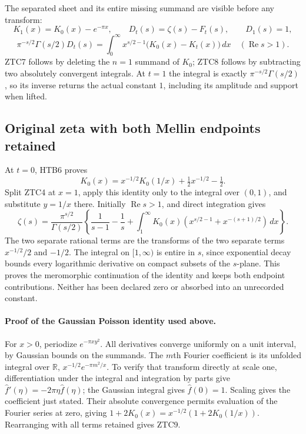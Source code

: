 \documentclass[11pt,a4paper]{article}
\theoremstyle{definition}\newtheorem{definition}[theorem]{Definition}
\begin{document}
The separated sheet and its entire missing summand are visible before
any transform:
\begin{equation}\tag{ZTC7}
 K_1(x)=K_0(x)-e^{-\pi x},\qquad
 D_t(s)=\zeta(s)-F_t(s),\qquad D_1(s)=1,
\end{equation}
\begin{equation}\tag{ZTC8}
 \pi^{-s/2}\Gamma(s/2)D_t(s)
   =\int_0^\infty x^{s/2-1}\bigl(K_0(x)-K_t(x)\bigr)\,dx
       \quad(\operatorname{Re}s>1).
\end{equation}
ZTC7 follows by deleting the $n=1$ summand of $K_0$; ZTC8 follows
by subtracting two absolutely convergent integrals. At $t=1$ the
integral is exactly $\pi^{-s/2}\Gamma(s/2)$, so its inverse returns
the actual constant $1$, including its amplitude and support when lifted.

\subsection{Original zeta with both Mellin endpoints retained}

At $t=0$, HTB6 proves
\begin{equation}\tag{ZTC9}
 K_0(x)=x^{-1/2}K_0(1/x)+\tfrac12x^{-1/2}-\tfrac12.
\end{equation}
Split ZTC4 at $x=1$, apply this identity only to the integral over
$(0,1)$, and substitute $y=1/x$ there. Initially
$\operatorname{Re}s>1$, and direct integration gives
\begin{equation}\tag{ZTC10}
 \zeta(s)=\frac{\pi^{s/2}}{\Gamma(s/2)}
 \left\{
 \frac1{s-1}-\frac1s
 +\int_1^\infty K_0(x)
             \left(x^{s/2-1}+x^{-(s+1)/2}\right)\,dx
 \right\}.
\end{equation}
The two separate rational terms are the transforms of the two separate
terms $x^{-1/2}/2$ and $-1/2$. The integral on $[1,\infty)$ is
entire in $s$, since exponential decay bounds every logarithmic
derivative on compact subsets of the $s$-plane. This proves the
meromorphic continuation of the identity and keeps both endpoint
contributions. Neither has been declared zero or absorbed into an
unrecorded constant.


\paragraph{Proof of the Gaussian Poisson identity used above.}
For $x>0$, periodize $e^{-\pi x y^2}$. All derivatives converge
uniformly on a unit interval, by Gaussian bounds on the summands.
The $m$th Fourier coefficient is its unfolded integral over $\mathbb R$,
$x^{-1/2}e^{-\pi m^2/x}$. To verify that transform directly at scale
one, differentiation under the integral and integration by parts give
$\widehat f'(\eta)=-2\pi\eta\widehat f(\eta)$; the Gaussian integral
gives $\widehat f(0)=1$. Scaling gives the coefficient just stated.
Their absolute convergence permits evaluation of the Fourier series
at zero, giving $1+2K_0(x)=x^{-1/2}(1+2K_0(1/x))$.
Rearranging with all terms retained gives ZTC9.
\end{document}
